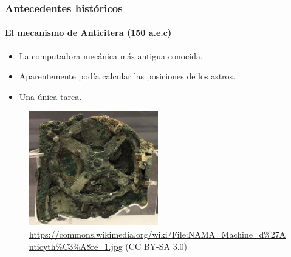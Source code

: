 \documentclass[11pt,a4paper,spanish]{beamer}
\newcommand{\aprox}{\raisebox{0.5ex}{\texttildelow}}
\begin{document}
\begin{frame}

\frametitle{Antecedentes históricos}
\framesubtitle{El mecanismo de Anticitera ({\aprox}150 a.e.c)}


\begin{itemize}
    \item La computadora mecánica más antigua conocida.
    \item Aparentemente podía calcular las posiciones de los astros.
    \item Una única tarea.
\end{itemize}


    \begin{figure}
        \includegraphics[width=0.5\textwidth]{img/anticitera.jpg}
        \captionsetup{textfont=tiny,labelformat=empty}
        \caption{\tiny{\url{https://commons.wikimedia.org/wiki/File:NAMA\_Machine\_d\%27Anticyth\%C3\%A8re\_1.jpg} (CC BY-SA 3.0)}}
    \end{figure}


\end{frame}
\end{document}
